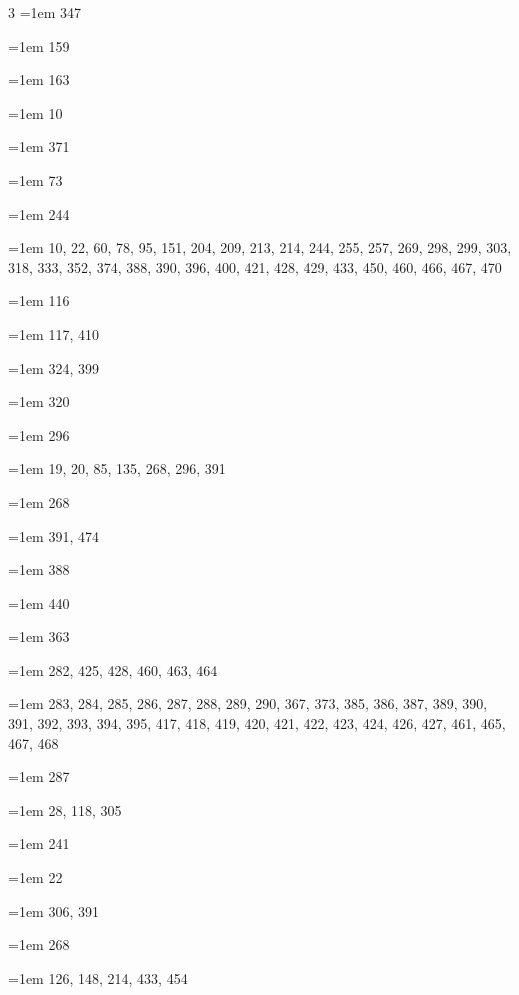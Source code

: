 \begin{multicols}{3}
\hangindent=1em  347\par
\hangindent=1em  159\par
\hangindent=1em  163\par
\hangindent=1em  10\par
\hangindent=1em  371\par
\hangindent=1em  73\par
\hangindent=1em  244\par
\hangindent=1em  10, 22, 60, 78, 95, 151, 204, 209, 213, 214, 244, 255, 257, 269, 298, 299, 303, 318, 333, 352, 374, 388, 390, 396, 400, 421, 428, 429, 433, 450, 460, 466, 467, 470\par
\hangindent=1em  116\par
\hangindent=1em  117, 410\par
\hangindent=1em  324, 399\par
\hangindent=1em  320\par
\hangindent=1em  296\par
\hangindent=1em  19, 20, 85, 135, 268, 296, 391\par
\hangindent=1em  268\par
\hangindent=1em  391, 474\par
\hangindent=1em  388\par
\hangindent=1em  440\par
\hangindent=1em  363\par
\hangindent=1em  282, 425, 428, 460, 463, 464\par
\hangindent=1em  283, 284, 285, 286, 287, 288, 289, 290, 367, 373, 385, 386, 387, 389, 390, 391, 392, 393, 394, 395, 417, 418, 419, 420, 421, 422, 423, 424, 426, 427, 461, 465, 467, 468\par
\hangindent=1em  287\par
\hangindent=1em  28, 118, 305\par
\hangindent=1em  241\par
\hangindent=1em  22\par
\hangindent=1em  306, 391\par
\hangindent=1em  268\par
\hangindent=1em  126, 148, 214, 433, 454\par

\end{multicols}
